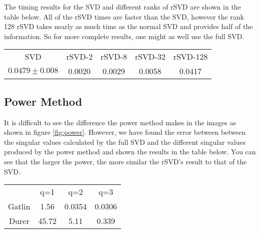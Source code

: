 \documentclass{article}
\begin{document}
The timing results for the SVD and different ranks of rSVD are shown in the table below. All of the rSVD times are faster than the SVD, however the rank 128 rSVD takes nearly as much time as the normal SVD and provides half of the information. So for more complete results, one might as well use the full SVD. 

\begin{center}
\begin{tabular}{ c c c c c }
 SVD & rSVD-2 & rSVD-8 & rSVD-32 & rSVD-128 \\ 
 $0.0479\pm0.008$ & 0.0020 & 0.0029 & 0.0058 & 0.0417
\end{tabular}
\end{center}

\subsection{Power Method}

It is difficult to see the difference the power method makes in the images as shown in figure \ref{fig:power}. However, we have found the error between between the singular values calculated by the full SVD and the different singular values produced by the power method and shown the results in the table below. You can see that the larger the power, the more similar the rSVD's result to that of the SVD.


\begin{center}
\begin{tabular}{ c c c c }
 & q=1 & q=2 & q=3\\ 
Gatlin & 1.56 & 0.0354& 0.0306\\
Durer & 45.72 & 5.11 & 0.339
\end{tabular}
\end{center}
\end{document}
